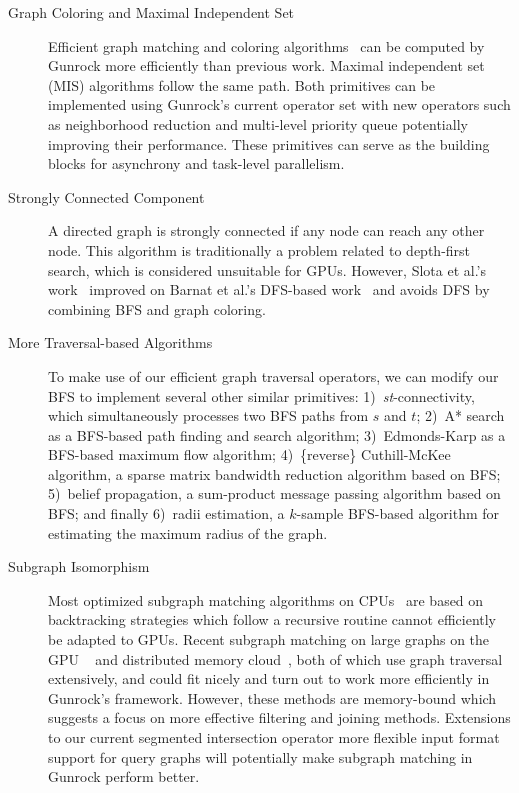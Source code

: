 \documentclass[format=acmsmall,review=false,screen=true]{acmart}
\begin{document}
\begin{description}
\item[Graph Coloring and Maximal Independent Set] Efficient graph
  matching and coloring algorithms~\cite{Cohen:2012:EGM} can be
  computed by Gunrock more efficiently than previous work. Maximal
  independent set (MIS) algorithms follow the same path. Both
  primitives can be implemented using Gunrock's current operator set
  with new operators such as neighborhood reduction and multi-level
  priority queue potentially improving their performance. These
  primitives can serve as the building blocks for asynchrony and
  task-level parallelism.

\item[Strongly Connected Component] A directed graph is strongly
  connected if any node can reach any other node. This algorithm is
  traditionally a problem related to depth-first search, which is
  considered unsuitable for GPUs. However, Slota et al.'s
  work~ improved on Barnat et al.'s
  DFS-based work~ and avoids DFS by
  combining BFS and graph coloring.

\item[More Traversal-based Algorithms] To make use of our efficient
  graph traversal operators, we can modify our BFS to implement
  several other similar primitives: 1)~\emph{st}-connectivity, which
  simultaneously processes two BFS paths from $s$ and $t$; 2)~A*
  search as a BFS-based path finding and search algorithm;
  3)~Edmonds-Karp as a BFS-based maximum flow algorithm;
  4)~\{reverse\} Cuthill-McKee algorithm, a sparse matrix bandwidth
  reduction algorithm based on BFS; 5)~belief propagation, a
  sum-product message passing algorithm based on BFS; and finally
  6)~radii estimation, a $k$-sample BFS-based algorithm for estimating
  the maximum radius of the graph.

\item[Subgraph Isomorphism] Most optimized subgraph matching algorithms
  on CPUs~\cite{Han:2013:TTU} are based on backtracking strategies which
  follow a recursive routine cannot efficiently be adapted to GPUs.
  Recent subgraph matching on large graphs on the GPU ~\cite{Renz:2015:FSM}
  and distributed memory cloud~\cite{Sun:2012:ESM,Brocheler:2010:CCO},
  both of which use graph traversal extensively,
  and could fit nicely and turn out to work more efficiently in Gunrock's
  framework. However, these methods are memory-bound which suggests a focus
  on more effective filtering and joining methods. Extensions to our current
  segmented intersection operator more flexible input format support for query
  graphs will potentially make subgraph matching in Gunrock perform better.


\end{description}
\end{document}
